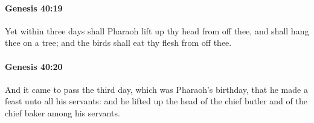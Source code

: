 		\paragraph{Genesis 40:19} %
			\label{GENESIS-40-19}

			Yet within three days shall Pharaoh lift up thy head from off thee, and shall hang thee on a tree; and the birds shall eat thy flesh from off thee.


		\paragraph{Genesis 40:20} %
			\label{GENESIS-40-20}

			And it came to pass the third day, which was Pharaoh's birthday, that he made a feast unto all his servants: and he lifted up the head of the chief butler and of the chief baker among his servants.


